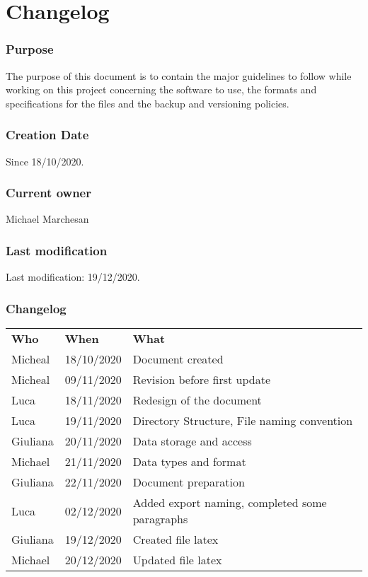 \section{Changelog}

\subsubsection{Purpose}
The purpose of this document is to contain the major guidelines to follow while working on this project concerning the software to use, the formats and specifications for the files and the backup and versioning policies.

\subsubsection{Creation Date}
Since 18/10/2020.\\

\subsubsection{Current owner}
Michael Marchesan

\subsubsection{Last modification}
Last modification: 19/12/2020.

\subsubsection{Changelog}
\begin{longtable}{ m{2cm}m{3cm}m{8cm}} 
\centering 
 \textbf{Who}& \textbf{When} & \textbf{What}\\
Micheal & 18/10/2020 & Document created \\
Micheal & 09/11/2020 & Revision before first update \\
Luca & 18/11/2020 & Redesign of the document \\
Luca & 19/11/2020 & Directory Structure, File naming convention \\
Giuliana & 20/11/2020 & Data storage and access \\
Michael & 21/11/2020 & Data types and format  \\
Giuliana & 22/11/2020 & Document preparation \\
Luca & 02/12/2020 & Added export naming, completed some paragraphs \\
Giuliana & 19/12/2020 & Created file latex \\
Michael & 20/12/2020 & Updated file latex \\

\end{longtable}

\pagebreak
